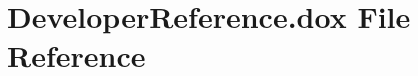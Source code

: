 \hypertarget{DeveloperReference_8dox}{}\section{Developer\+Reference.\+dox File Reference}
\label{DeveloperReference_8dox}
